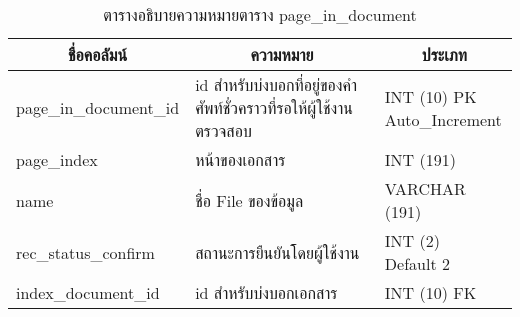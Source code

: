 \begin{table}[H]
\caption{ตารางอธิบายความหมายตาราง page\_in\_document}\label{tbl:pageindocument}        
\begin{tabular}{|l|l|l|}
\hline
\multicolumn{1}{|c|}{ชื่อคอลัมน์} & \multicolumn{1}{c|}{ความหมาย}                                      & \multicolumn{1}{c|}{ประเภท}                                                   \\ \hline
page\_in\_document\_id            & id   สำหรับบ่งบอกที่อยู่ของคำศัพท์ชั่วคราวที่รอให้ผู้ใช้งานตรวจสอบ & \makecell[l]{INT   (10) PK\\Auto\_Increment} \\ \hline
page\_index                       & หน้าของเอกสาร                                                      & INT   (191)                                                                   \\ \hline
name                              & ชื่อ   File ของข้อมูล                                              & VARCHAR   (191)                                                               \\ \hline
rec\_status\_confirm              & สถานะการยืนยันโดยผู้ใช้งาน                                         & \makecell[l]{INT   (2)\\Default   2}         \\ \hline
index\_document\_id               & id สำหรับบ่งบอกเอกสาร                                              & INT (10) FK                                                                   \\ \hline
\end{tabular}
\end{table}

